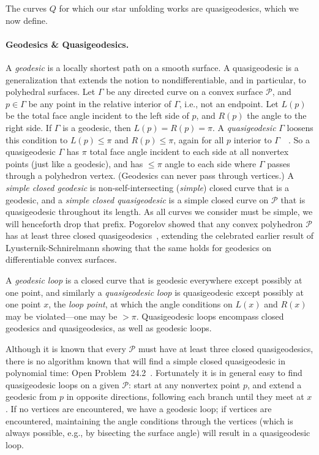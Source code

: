 \pdfoutput=1  \documentclass[]{article}
\def\P{{\mathcal P}}
\def\G{{\Gamma}}
\begin{document}
The curves $Q$ for which our star unfolding works are
quasigeodesics, which we now define.



\paragraph{Geodesics \& Quasigeodesics.}
A \emph{geodesic} is a locally shortest path on a smooth surface.
A quasigeodesic is a generalization that extends the notion to 
nondifferentiable, and in particular, to
polyhedral surfaces.
Let $\G$ be any directed curve on a convex surface $\P$, 
and $p \in \G$ be any point in the relative interior of $\G$, i.e., not
an endpoint.
Let $L(p)$ be the total face angle incident to the left side of $p$,
and $R(p)$ the angle to the right side.
If $\G$ is a geodesic, then $L(p){=}R(p)=\pi$.
A \emph{quasigeodesic} $\G$ loosens this condition to $L(p) \le \pi$ and $R(p) \le \pi$,
again for all $p$ interior to $\G$~\cite[p.~16]{az-igs-67}~\cite[p.~28]{p-egcs-73}.
So a quasigeodesic $\G$ has $\pi$ total face angle incident to each
side at all nonvertex points (just like a geodesic),
and has ${\le}\pi$ angle to each side where $\G$ passes through a
polyhedron vertex.
(Geodesics can never pass through vertices.)
A \emph{simple closed geodesic} is non-self-intersecting (\emph{simple}) closed
curve that is a geodesic, and
a \emph{simple closed quasigeodesic} is a simple closed curve
on $\P$ that is quasigeodesic throughout its length.
As all curves we consider must be simple, we will henceforth
drop that prefix.
Pogorelov showed that any convex polyhedron $\P$ has at least three closed
quasigeodesics~\cite{p-qglcs-49}, extending the celebrated earlier result of
Lyusternik-Schnirelmann showing that the same holds for geodesics on 
differentiable convex surfaces.

A \emph{geodesic loop} is a closed curve that is geodesic
everywhere except possibly at one point,
and similarly a \emph{quasigeodesic loop} is quasigeodesic except
possibly at one point $x$, the \emph{loop point}, at which the angle conditions
on $L(x)$ and $R(x)$ may be violated---one may be ${>} \pi$.
Quasigeodesic loops encompass
closed geodesics and quasigeodesics,
as well as geodesic loops.

Although it is known that every $\P$ must have at least
three closed quasigeodesics, 
there is no algorithm known that will find a simple closed quasigeodesic
in polynomial time:
Open Problem~24.2~\cite[p.~374]{do-gfalop-07}.
Fortunately it is in general
easy to find quasigeodesic loops on a given $\P$:
start at any nonvertex point $p$, and extend a geodesic from
$p$ in opposite directions, following each branch until they meet
at $x$.  If no vertices are encountered, we have a geodesic loop;
if vertices are encountered, maintaining the angle conditions through the
vertices (which is always possible, e.g., by bisecting the surface angle) will
result in a quasigeodesic loop.
\end{document}
